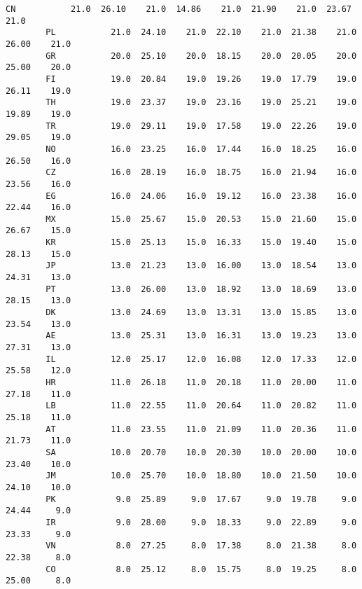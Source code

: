 \documentclass[11pt]{article}
\begin{document}
\begin{Verbatim}[commandchars=\\\{\}]
        CN           21.0  26.10    21.0  14.86    21.0  21.90    21.0  23.67    21.0   
        PL           21.0  24.10    21.0  22.10    21.0  21.38    21.0  26.00    21.0   
        GR           20.0  25.10    20.0  18.15    20.0  20.05    20.0  25.00    20.0   
        FI           19.0  20.84    19.0  19.26    19.0  17.79    19.0  26.11    19.0   
        TH           19.0  23.37    19.0  23.16    19.0  25.21    19.0  19.89    19.0   
        TR           19.0  29.11    19.0  17.58    19.0  22.26    19.0  29.05    19.0   
        NO           16.0  23.25    16.0  17.44    16.0  18.25    16.0  26.50    16.0   
        CZ           16.0  28.19    16.0  18.75    16.0  21.94    16.0  23.56    16.0   
        EG           16.0  24.06    16.0  19.12    16.0  23.38    16.0  22.44    16.0   
        MX           15.0  25.67    15.0  20.53    15.0  21.60    15.0  26.67    15.0   
        KR           15.0  25.13    15.0  16.33    15.0  19.40    15.0  28.13    15.0   
        JP           13.0  21.23    13.0  16.00    13.0  18.54    13.0  24.31    13.0   
        PT           13.0  26.00    13.0  18.92    13.0  18.69    13.0  28.15    13.0   
        DK           13.0  24.69    13.0  13.31    13.0  15.85    13.0  23.54    13.0   
        AE           13.0  25.31    13.0  16.31    13.0  19.23    13.0  27.31    13.0   
        IL           12.0  25.17    12.0  16.08    12.0  17.33    12.0  25.58    12.0   
        HR           11.0  26.18    11.0  20.18    11.0  20.00    11.0  27.18    11.0   
        LB           11.0  22.55    11.0  20.64    11.0  20.82    11.0  25.18    11.0   
        AT           11.0  23.55    11.0  21.09    11.0  20.36    11.0  21.73    11.0   
        SA           10.0  20.70    10.0  20.30    10.0  20.00    10.0  23.40    10.0   
        JM           10.0  25.70    10.0  18.80    10.0  21.50    10.0  24.10    10.0   
        PK            9.0  25.89     9.0  17.67     9.0  19.78     9.0  24.44     9.0   
        IR            9.0  28.00     9.0  18.33     9.0  22.89     9.0  23.33     9.0   
        VN            8.0  27.25     8.0  17.38     8.0  21.38     8.0  22.38     8.0   
        CO            8.0  25.12     8.0  15.75     8.0  19.25     8.0  25.00     8.0   
        

\end{Verbatim}
\end{document}
